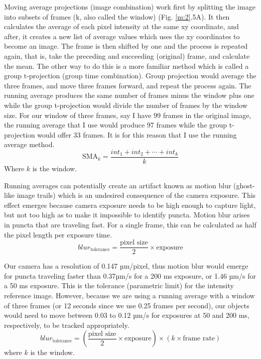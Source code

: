 Moving average projections (image combination) work first by splitting the image into subsets of frames (k, also called the window) (Fig. \ref{m:2}.5A). It then calculates the average of each pixel intensity at the same xy coordinate, and after, it creates a new list of average values which uses the xy coordinates to become an image. The frame is then shifted by one and the process is repeated again, that is, take the preceding and succeeding (original) frame, and calculate the mean. The other way to do this is a more familiar method which is called a group t-projection (group time combination). Group projection would average the three frames, and move three frames forward, and repeat the process again. The running average produces the same number of frames minus the window plus one while the group t-projection would divide the number of frames by the window size. For our window of three frames, say I have 99 frames in the original image, the running average that I use would produce 97 frames while the group t-projection would offer 33 frames. It is for this reason that I use the running average method.
\begin{equation}
\text{SMA}_k = \frac{int_1 + int_2 + \cdots + int_k}{k}
\end{equation}
Where $k$ is the window.

Running averages can potentially create an artifact known as motion blur (ghost-like image trails) which is an undesired consequence of the camera exposure. This effect emerges because camera exposure needs to be high enough to capture light, but not too high as to make it impossible to identify puncta. Motion blur arises in puncta that are traveling fast. For a single frame, this can be calculated as half the pixel length per exposure time.
\begin{equation}
blur_{\text{tolerance}} = \frac{\text{pixel size}}{2}\times \text{exposure}
\end{equation}

Our camera has a resolution of 0.147 µm/pixel, thus motion blur would emerge for puncta traveling faster than 0.37µm/s for a 200 ms exposure, or 1.46 µm/s for a 50 ms exposure. This is the tolerance (parametric limit) for the intensity reference image. However, because we are using a running average with a window of three frames (or 12 seconds since we use 0.25 frames per second), our objects would need to move between 0.03 to 0.12 µm/s for exposures at 50 and 200 ms, respectively, to be tracked appropriately.
\begin{equation}
blur_{\text{tolerance}} = (\frac{\text{pixel size}}{2}\times \text{exposure}) \times (k \times \text{frame rate})
\end{equation}
where $k$ is the window.

